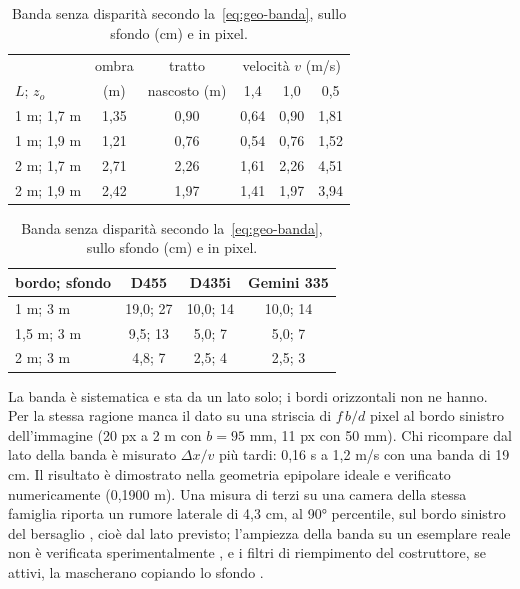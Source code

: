 \begin{table}[htb]\small
\begin{minipage}[t]{0.52\textwidth}\centering
\caption{Durata dell'occlusione totale $T_{\mathrm{tot}}$ (s) secondo la~\eqref{eq:geo-durata}, con $z_p=2{,}3$ m e $w_c=0{,}45$ m. }\label{tab:geo-durata}
\begin{tabular}{@{}lccccc@{}}
\toprule
 & ombra & tratto & \multicolumn{3}{c}{velocità $v$ (m/s)}\\
$L$; $z_o$ & (m) & nascosto (m) & 1,4 & 1,0 & 0,5\\
\midrule
1 m; 1,7 m & 1,35 & 0,90 & 0,64 & 0,90 & 1,81\\
1 m; 1,9 m & 1,21 & 0,76 & 0,54 & 0,76 & 1,52\\
2 m; 1,7 m & 2,71 & 2,26 & 1,61 & 2,26 & 4,51\\
2 m; 1,9 m & 2,42 & 1,97 & 1,41 & 1,97 & 3,94\\
\bottomrule
\end{tabular}
\end{minipage}\hfill
\begin{minipage}[t]{0.45\textwidth}\centering
\caption{Banda senza disparità secondo la~\eqref{eq:geo-banda}, sullo sfondo (cm) e in pixel. }\label{tab:geo-banda}
\begin{tabular}{@{}lccc@{}}
\toprule
bordo; sfondo & D455 & D435i & Gemini 335\\
\midrule
1 m; 3 m & 19,0; 27 & 10,0; 14 & 10,0; 14\\
1,5 m; 3 m & 9,5; 13 & 5,0; 7 & 5,0; 7\\
2 m; 3 m & 4,8; 7 & 2,5; 4 & 2,5; 3\\
\bottomrule
\end{tabular}
\end{minipage}
\end{table}

La banda è sistematica e sta da un lato solo; i bordi orizzontali non ne hanno. Per la stessa ragione manca il dato su una striscia di $f\,b/d$ pixel al bordo sinistro dell'immagine (20 px a 2 m con $b=95$ mm, 11 px con 50 mm). Chi ricompare dal lato della banda è misurato $\Delta x/v$ più tardi: 0,16 s a 1,2 m/s con una banda di 19 cm. Il risultato è dimostrato nella geometria epipolare ideale e verificato numericamente (0,1900 m). Una misura di terzi su una camera della stessa famiglia riporta un rumore laterale di 4,3 cm, al 90° percentile, sul bordo sinistro del bersaglio \cite{ahn2019}, cioè dal lato previsto; l'ampiezza della banda su un esemplare reale non è verificata sperimentalmente , e i filtri di riempimento del costruttore, se attivi, la mascherano copiando lo sfondo \cite{realsense-filtri-post}.

